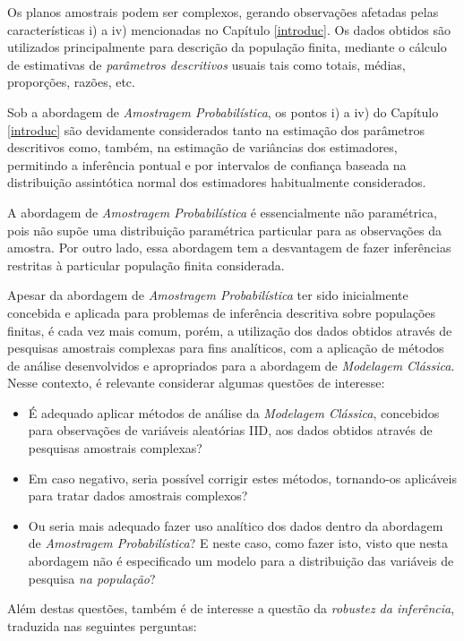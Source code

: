 \documentclass[
  12pt,
  brazilian,
]{book}
\theoremstyle{definition}
\theoremstyle{definition}
\theoremstyle{definition}
\theoremstyle{definition}
\theoremstyle{remark}
\begin{document}
Os planos amostrais podem ser complexos, gerando observações afetadas pelas
características i) a iv) mencionadas no Capítulo \ref{introduc}. Os dados
obtidos são utilizados principalmente para descrição da população finita,
mediante o cálculo de estimativas de \emph{parâmetros descritivos} usuais tais como
totais, médias, proporções, razões, etc.

Sob a abordagem de \emph{Amostragem Probabilística}, os pontos i) a iv) do Capítulo \ref{introduc} são devidamente considerados tanto na estimação dos parâmetros descritivos como, também, na estimação de variâncias dos estimadores, permitindo a inferência pontual e por intervalos de confiança baseada na distribuição assintótica normal dos estimadores habitualmente considerados.

A abordagem de \emph{Amostragem Probabilística} é essencialmente não paramétrica,
pois não supõe uma distribuição paramétrica particular para as observações da
amostra. Por outro lado, essa abordagem tem a desvantagem de fazer inferências
restritas à particular população finita considerada.

Apesar da abordagem de \emph{Amostragem Probabilística} ter sido inicialmente
concebida e aplicada para problemas de inferência descritiva sobre populações
finitas, é cada vez mais comum, porém, a utilização dos dados obtidos através de
pesquisas amostrais complexas para fins analíticos, com a aplicação de métodos
de análise desenvolvidos e apropriados para a abordagem de \emph{Modelagem Clássica}.
Nesse contexto, é relevante considerar algumas questões de interesse:

\begin{itemize}
\item
  É adequado aplicar métodos de análise da \emph{Modelagem Clássica}, concebidos para observações de variáveis aleatórias IID, aos dados obtidos através de pesquisas amostrais complexas?
\item
  Em caso negativo, seria possível corrigir estes métodos, tornando-os aplicáveis para tratar dados amostrais complexos?
\item
  Ou seria mais adequado fazer uso analítico dos dados dentro da abordagem de \emph{Amostragem Probabilística}? E neste caso, como fazer isto, visto que nesta abordagem não é especificado um modelo para a distribuição das variáveis de pesquisa \emph{na população}?
\end{itemize}

Além destas questões, também é de interesse a questão da \emph{robustez da inferência},
traduzida nas seguintes perguntas:
\end{document}
